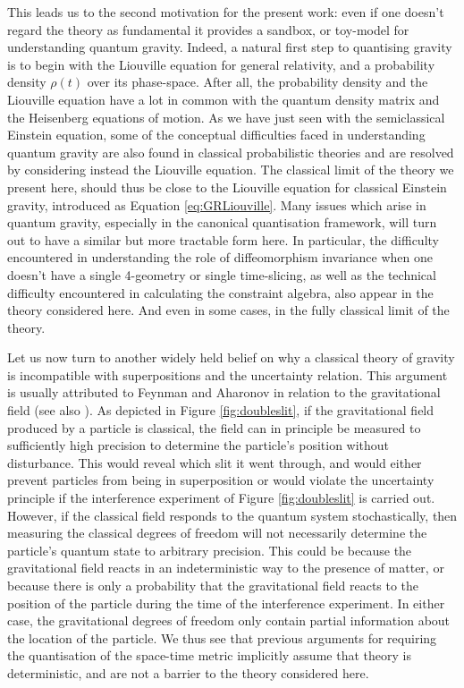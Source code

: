 \documentclass[aps,pra,showpacs,citeautoscript,amsmath,amssymb,floatfix,superscriptaddress,bbm, verbatim,amsfonts,changes,12pt,nofootinbib,longbibliography]{revtex4-2}
\begin{document}
This leads us to the second motivation for the present work: even if one doesn't regard the theory as fundamental it provides a sandbox, or toy-model for understanding quantum gravity.  Indeed, a natural first step to quantising gravity is to begin with the Liouville equation for general relativity, and a probability density $\rho(t)$ over its phase-space.  After all, the probability density and the Liouville equation have a lot in common with the quantum density matrix and the Heisenberg equations of motion. As we have just seen with the semiclassical Einstein equation, some of the conceptual difficulties faced in understanding quantum gravity are also found in classical probabilistic theories and are resolved by considering instead the Liouville equation. The classical limit of the theory we present here, should thus be close to the Liouville equation for classical Einstein gravity, introduced as Equation \eqref{eq:GRLiouville}.
Many issues which arise in quantum gravity, especially in the canonical quantisation framework, will turn out to have a similar but more tractable form here. In particular, the difficulty encountered in understanding the role of diffeomorphism invariance when one doesn't have a single 4-geometry or single time-slicing, as well as the technical difficulty encountered in calculating the constraint algebra, also appear in the theory considered here. And even in some cases, in the fully classical limit of the theory.


Let us now turn to another widely held belief on why a classical theory of gravity is incompatible with superpositions and the uncertainty relation. This argument is usually attributed to Feynman\cite{cecile2011role,Feynman:1996kb-note} and Aharonov\cite{AharonovParadoxes-note} in relation to the gravitational field (see also \cite{eppley1977necessity,Mari:2015qva,Baym3035,belenchia2018quantum,signal_foot}). As depicted in Figure \ref{fig:doubleslit}, if the gravitational field produced by a particle is classical, the field can in principle be measured to sufficiently high precision  
to determine the particle's position without disturbance. This would reveal which slit it went through, and would either prevent particles from being in superposition or would violate the uncertainty principle if the interference experiment of Figure \ref{fig:doubleslit} is carried out.  However, if the classical field responds to the quantum system stochastically\label{par:stochastic}\cite{hustochasticgravity_foot}, then measuring the classical degrees of freedom will not necessarily determine the particle's quantum state to arbitrary precision. This could be because the gravitational field reacts in an indeterministic way to the presence of matter,  or because there is only a probability that the gravitational field reacts to the position of the particle during the time of the interference experiment\cite{experiment_foot}. In either case, the gravitational degrees of freedom only contain partial information about the location of the particle. We thus see that previous arguments for requiring the quantisation of the space-time metric implicitly assume that theory is deterministic, and are not a barrier to the theory considered here.
\end{document}
